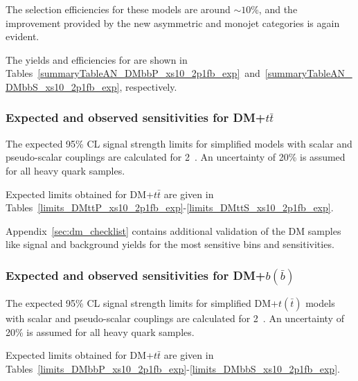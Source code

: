 The selection efficiencies for these models are around $\sim 10$\%, and the improvement
provided by the new asymmetric and monojet categories is again evident.

\clearpage 
%
% 
\clearpage


The yields and efficiencies for \DMbb are shown in Tables~\ref{summaryTableAN_DMbbP_xs10_2p1fb_exp}~and~\ref{summaryTableAN_DMbbS_xs10_2p1fb_exp}, respectively. 

%
% 
\clearpage


\subsubsection{Expected and observed sensitivities for DM+$t\bar{t}$}

The expected 95\% CL signal strength limits for simplified \DMtt models with scalar and
pseudo-scalar couplings are calculated for 2~\ifb. An uncertainty of 20\% is assumed for all 
heavy quark samples.



\clearpage
Expected limits obtained for DM+$t\bar{t}$ are given in Tables~\ref{limits_DMttP_xs10_2p1fb_exp}-\ref{limits_DMttS_xs10_2p1fb_exp}.
%
%



Appendix~\ref{sec:dm_checklist} contains additional validation of the \DMj DM samples like signal and background yields for the most sensitive bins and sensitivities.

\subsubsection{Expected and observed sensitivities for DM+$b(\bar{b})$}

The expected 95\% CL signal strength limits for simplified DM+$t(\bar{t})$ models with scalar and
pseudo-scalar couplings are calculated for 2~\ifb. An uncertainty of 20\% is assumed for all 
heavy quark samples.


\clearpage
Expected limits obtained for DM+$t\bar{t}$ are given in Tables~\ref{limits_DMbbP_xs10_2p1fb_exp}-\ref{limits_DMbbS_xs10_2p1fb_exp}. 

%
%



